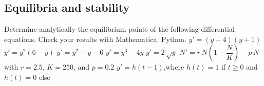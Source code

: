





\pagebreak
\subsection{Equilibria and stability}
\begin{Exercise} Determine analytically the equilibrium points of the following differential equations. Check your results with \ifmathematica Mathematica. \fi  \ifpython Python. \fi
				\Question $y' = (y - 4)(y + 1)$
				\Question $y' = y^2(6 - y)$
				\Question $y' = y^2 - y - 6$
				\Question $y' = y^3 - 4y$
				\Question $y'=2\,\sqrt y$
				\Question $N' = r\,N\left(1 - \dfrac{N}{K}\right) - p\,N$ \quad with $r = 2.5$, $K = 250$, and $p = 0.2$
                \Question $y'=h(t-1)$,\quad where $h(t)=1$ if $t\geq0$ and $h(t)=0$ else
    \EndCurrentQuestion
\end{Exercise}

